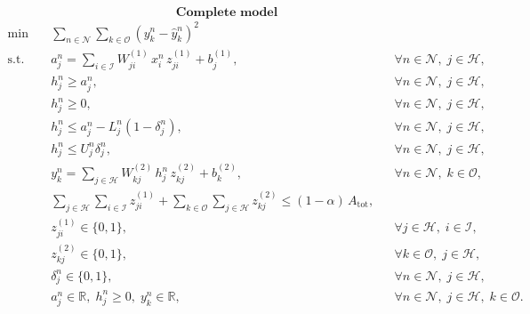 \documentclass[12pt, a4paper]{article}
\begin{document}
\[
\textbf{Complete model}
\]
\[
\begin{aligned}
\min \quad & \sum_{n\in\mathcal{N}} \sum_{k\in\mathcal{O}}
\left(y^n_k-\hat{y}^n_k\right)^2 \\
\text{s.t.}\quad
& a^n_j = \sum_{i\in\mathcal{I}} W^{(1)}_{ji}\, x^n_i \, z^{(1)}_{ji} + b^{(1)}_j,
&& \forall n\in\mathcal{N},\; j\in\mathcal{H},\\
& h^n_j \ge a^n_j,
&& \forall n\in\mathcal{N},\; j\in\mathcal{H},\\
& h^n_j \ge 0,
&& \forall n\in\mathcal{N},\; j\in\mathcal{H},\\
& h^n_j \le a^n_j - L^n_j(1-\delta^n_j),
&& \forall n\in\mathcal{N},\; j\in\mathcal{H},\\
& h^n_j \le U^n_j \delta^n_j,
&& \forall n\in\mathcal{N},\; j\in\mathcal{H},\\
& y^n_k = \sum_{j\in\mathcal{H}} W^{(2)}_{kj}\, h^n_j \, z^{(2)}_{kj} + b^{(2)}_k,
&& \forall n\in\mathcal{N},\; k\in\mathcal{O},\\
& \sum_{j\in\mathcal{H}}\sum_{i\in\mathcal{I}} z^{(1)}_{ji}
+
\sum_{k\in\mathcal{O}}\sum_{j\in\mathcal{H}} z^{(2)}_{kj}
\le (1-\alpha)\,A_{\text{tot}}, \\
& z^{(1)}_{ji}\in\{0,1\},
&& \forall j\in\mathcal{H},\; i\in\mathcal{I},\\
& z^{(2)}_{kj}\in\{0,1\},
&& \forall k\in\mathcal{O},\; j\in\mathcal{H},\\
& \delta^n_j\in\{0,1\},
&& \forall n\in\mathcal{N},\; j\in\mathcal{H},\\
& a^n_j\in\mathbb{R},\; h^n_j\ge 0,\; y^n_k\in\mathbb{R},
&& \forall n\in\mathcal{N},\; j\in\mathcal{H},\; k\in\mathcal{O}.
\end{aligned}
\]
\end{document}
